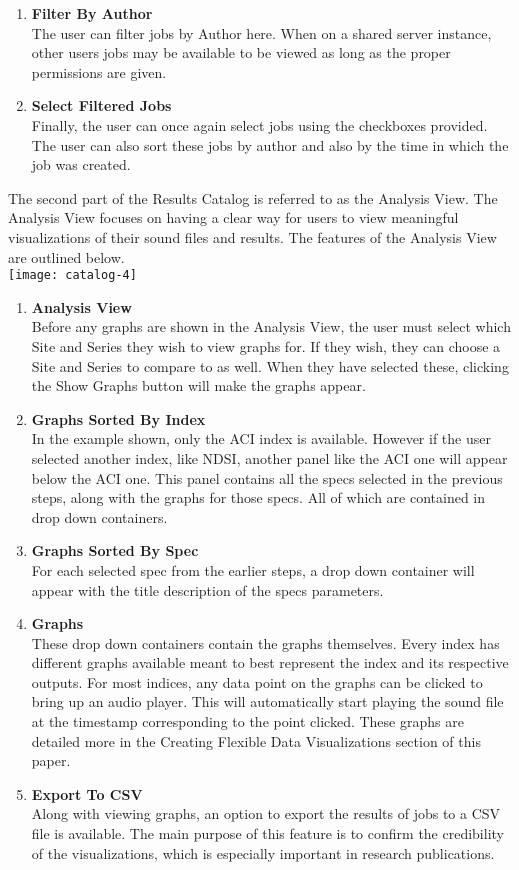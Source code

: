 \begin{enumerate}
    \item \textbf{Filter By Author}\\ The user can filter jobs by Author here. When on a shared server instance, other user\textquotesingle s jobs may be available to be viewed as long as the proper permissions are given.
    \item \textbf{Select Filtered Jobs}\\ Finally, the user can once again select jobs using the checkboxes provided. The user can also sort these jobs by author and also by the time in which the job was created.
\end{enumerate}
The second part of the Results Catalog is referred to as the Analysis View. The Analysis View focuses on having a clear way for users to view meaningful visualizations of their sound files and results. The features of the Analysis View are outlined below.\\
\texttt{[image: catalog-4]}
\begin{enumerate}
  \item \textbf{Analysis View}\\ Before any graphs are shown in the Analysis View, the user must select which Site and Series they wish to view graphs for. If they wish, they can choose a Site and Series to compare to as well. When they have selected these, clicking the Show Graphs button will make the graphs appear.
  \item \textbf{Graphs Sorted By Index}\\ In the example shown, only the ACI index is available. However if the user selected another index, like NDSI, another panel like the ACI one will appear below the ACI one. This panel contains all the specs selected in the previous steps, along with the graphs for those specs. All of which are contained in drop down containers.
  \item \textbf{Graphs Sorted By Spec}\\ For each selected spec from the earlier steps, a drop down container will appear with the title description of the spec\textquotesingle s parameters.
  \item \textbf{Graphs}\\ These drop down containers contain the graphs themselves. Every index has different graphs available meant to best represent the index and its respective outputs. For most indices, any data point on the graphs can be clicked to bring up an audio player. This will automatically start playing the sound file at the timestamp corresponding to the point clicked. These graphs are detailed more in the Creating Flexible Data Visualizations section of this paper.
  \item \textbf{Export To CSV}\\ Along with viewing graphs, an option to export the results of jobs to a CSV file is available. The main purpose of this feature is to confirm the credibility of the visualizations, which is especially important in research publications.
\end{enumerate}
